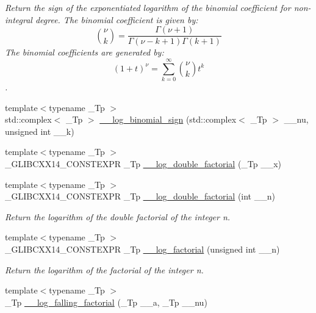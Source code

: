 \begin{DoxyCompactItemize}
\begin{DoxyCompactList}\small\item\em Return the sign of the exponentiated logarithm of the binomial coefficient for non-\/integral degree. The binomial coefficient is given by\+: \[ \binom{\nu}{k} = \frac{\Gamma(\nu+1)}{\Gamma(\nu-k+1) \Gamma(k+1)} \] The binomial coefficients are generated by\+: \[ \left(1 + t\right)^\nu = \sum_{k=0}^\infty \binom{\nu}{k} t^k \]. \end{DoxyCompactList}\item 
{\footnotesize template$<$typename \+\_\+\+Tp $>$ }\\std\+::complex$<$ \+\_\+\+Tp $>$ \hyperlink{namespacestd_1_1____detail_ad73e7e0dfab6a4f54af026fa3d9e9c9a}{\+\_\+\+\_\+log\+\_\+binomial\+\_\+sign} (std\+::complex$<$ \+\_\+\+Tp $>$ \+\_\+\+\_\+nu, unsigned int \+\_\+\+\_\+k)
\item 
{\footnotesize template$<$typename \+\_\+\+Tp $>$ }\\\+\_\+\+G\+L\+I\+B\+C\+X\+X14\+\_\+\+C\+O\+N\+S\+T\+E\+X\+PR \+\_\+\+Tp \hyperlink{namespacestd_1_1____detail_a0de46e790512550b535bdda97e11e1b5}{\+\_\+\+\_\+log\+\_\+double\+\_\+factorial} (\+\_\+\+Tp \+\_\+\+\_\+x)
\item 
{\footnotesize template$<$typename \+\_\+\+Tp $>$ }\\\+\_\+\+G\+L\+I\+B\+C\+X\+X14\+\_\+\+C\+O\+N\+S\+T\+E\+X\+PR \+\_\+\+Tp \hyperlink{namespacestd_1_1____detail_aa832ed1d29fd41c40cf892cc1feef7e9}{\+\_\+\+\_\+log\+\_\+double\+\_\+factorial} (int \+\_\+\+\_\+n)
\begin{DoxyCompactList}\small\item\em Return the logarithm of the double factorial of the integer n. \end{DoxyCompactList}\item 
{\footnotesize template$<$typename \+\_\+\+Tp $>$ }\\\+\_\+\+G\+L\+I\+B\+C\+X\+X14\+\_\+\+C\+O\+N\+S\+T\+E\+X\+PR \+\_\+\+Tp \hyperlink{namespacestd_1_1____detail_a2809419dbbe9fc60066dacfdc13761d4}{\+\_\+\+\_\+log\+\_\+factorial} (unsigned int \+\_\+\+\_\+n)
\begin{DoxyCompactList}\small\item\em Return the logarithm of the factorial of the integer n. \end{DoxyCompactList}\item 
{\footnotesize template$<$typename \+\_\+\+Tp $>$ }\\\+\_\+\+Tp \hyperlink{namespacestd_1_1____detail_abc3aa91fde134d9f01be8fc8e7c7cc79}{\+\_\+\+\_\+log\+\_\+falling\+\_\+factorial} (\+\_\+\+Tp \+\_\+\+\_\+a, \+\_\+\+Tp \+\_\+\+\_\+nu)

\end{DoxyCompactItemize}
